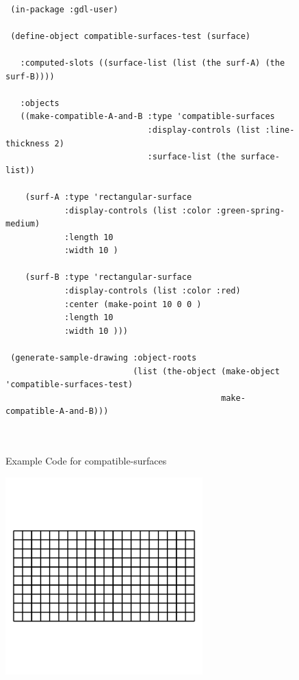 \documentclass [11pt]{book}
\begin{document}
\begin{itemize}
\begin{description}
\end{description}




\begin{figure}
\begin{lrbox}{\boxedverb}
\begin{minipage}{\linewidth}
{\small

\begin{verbatim}

 (in-package :gdl-user)

 (define-object compatible-surfaces-test (surface) 

   :computed-slots ((surface-list (list (the surf-A) (the surf-B))))
  
   :objects
   ((make-compatible-A-and-B :type 'compatible-surfaces
                             :display-controls (list :line-thickness 2)
                             :surface-list (the surface-list))

    (surf-A :type 'rectangular-surface
            :display-controls (list :color :green-spring-medium)
            :length 10
            :width 10 )
                                        
    (surf-B :type 'rectangular-surface
            :display-controls (list :color :red)
            :center (make-point 10 0 0 )
            :length 10
            :width 10 )))

 (generate-sample-drawing :object-roots 
                          (list (the-object (make-object 'compatible-surfaces-test) 
                                            make-compatible-A-and-B)))
 
 
\end{verbatim}}
\end{minipage}
\end{lrbox}
\fbox{\usebox{\boxedverb}}

\caption{Example Code for compatible-surfaces}

\label{fig:example-code-compatible-surfaces}

\end{figure}

\begin{figure}
\begin{center}
\includegraphics[width=3in,height=3in]{../images/example-compatible-surfaces.pdf}
\end{center}


\end{figure}
\end{itemize}
\end{document}
